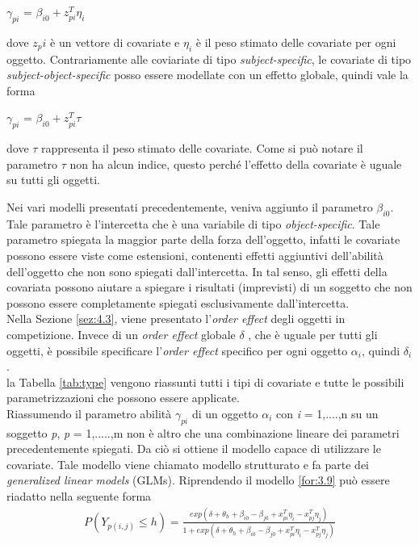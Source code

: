 \begin{itemize}
		\begin{center}
		$ \gamma_{pi}$ = $\beta_{i0} + z^{T}_{pi}\eta_i$
	\end{center}
		dove $z_pi$ è un vettore di covariate e $\eta_i$ è il peso stimato delle covariate per ogni oggetto. Contrariamente alle coviariate di tipo \emph{subject-specific}, le covariate di tipo \emph{subject-object-specific} posso essere modellate con un effetto globale, quindi vale la forma 
		\begin{center}
			$ \gamma_{pi}$ = $\beta_{i0} + z^{T}_{pi}\tau$
		\end{center}
	 dove $\tau$ rappresenta il peso stimato delle covariate. Come si può notare il parametro $\tau$ non ha alcun indice, questo perché l'effetto della covariate è uguale su tutti gli oggetti.
\end{itemize}
Nei vari modelli presentati precedentemente, veniva aggiunto il parametro $\beta_{i0}$. Tale parametro è l'intercetta che è una variabile di tipo \emph{object-specific}. Tale parametro spiegata la maggior parte della forza dell'oggetto, infatti le covariate possono essere viste come estensioni, contenenti effetti aggiuntivi dell'abilità dell'oggetto che non sono spiegati dall'intercetta. In tal senso, gli effetti della covariata possono aiutare a spiegare i risultati (imprevisti) di un soggetto che non possono essere completamente spiegati esclusivamente dall'intercetta.\\
Nella Sezione \ref{sez:4.3}, viene presentato l'\emph{order effect} degli oggetti in competizione. Invece di un \emph{order effect} globale $\delta$ , che è uguale per tutti gli oggetti, è possibile specificare l'\emph{order effect} specifico per ogni oggetto $\alpha_i$, quindi $\delta_i$.\\
la Tabella \ref{tab:type} vengono riassunti tutti i tipi di covariate e tutte le possibili parametrizzazioni che possono essere applicate.\\
Riassumendo il parametro abilità  $\gamma_{pi}$ di un oggetto $\alpha_i$ con \emph{i} = 1,....,n su un soggetto \emph{p}, \emph{p} = 1,.....,m non è altro che una combinazione lineare dei parametri precedentemente spiegati. Da ciò si ottiene il modello capace di utilizzare le covariate. Tale modello viene chiamato modello strutturato e fa parte dei \emph{generalized linear models} (GLMs). Riprendendo il modello \ref{for:3.9} può essere riadatto nella seguente forma
\begin{align}
	P(Y_{p(i,j)}\leq h) =  \frac{exp(\delta + \theta_{h} + \beta_{i0} - \beta_{j0} + x^T_{pi}\eta_i - x^T_{pj}\eta_j)}{1 + exp(\delta + \theta_{h} + \beta_{i0} - \beta_{j0} + x^T_{pi}\eta_i - x^T_{pj}\eta_j)} \label{for:4.9}
\end{align}

